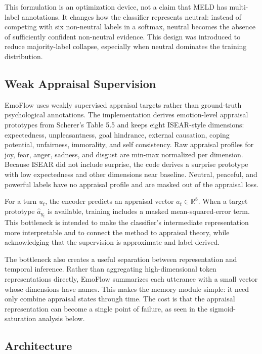 \documentclass[11pt]{article}
\begin{document}
This formulation is an optimization device, not a claim that MELD has multi-label annotations. It changes how the classifier represents neutral: instead of competing with six non-neutral labels in a softmax, neutral becomes the absence of sufficiently confident non-neutral evidence. This design was introduced to reduce majority-label collapse, especially when neutral dominates the training distribution.

\subsection{Weak Appraisal Supervision}

EmoFlow uses weakly supervised appraisal targets rather than ground-truth psychological annotations. The implementation derives emotion-level appraisal prototypes from Scherer's Table 5.5 and keeps eight ISEAR-style dimensions: expectedness, unpleasantness, goal hindrance, external causation, coping potential, unfairness, immorality, and self consistency. Raw appraisal profiles for joy, fear, anger, sadness, and disgust are min-max normalized per dimension. Because ISEAR did not include surprise, the code derives a surprise prototype with low expectedness and other dimensions near baseline. Neutral, peaceful, and powerful labels have no appraisal profile and are masked out of the appraisal loss.

For a turn $u_t$, the encoder predicts an appraisal vector $a_t \in \mathbb{R}^8$. When a target prototype $\hat{a}_{y_t}$ is available, training includes a masked mean-squared-error term. This bottleneck is intended to make the classifier's intermediate representation more interpretable and to connect the method to appraisal theory, while acknowledging that the supervision is approximate and label-derived.

The bottleneck also creates a useful separation between representation and temporal inference. Rather than aggregating high-dimensional token representations directly, EmoFlow summarizes each utterance with a small vector whose dimensions have names. This makes the memory module simple: it need only combine appraisal states through time. The cost is that the appraisal representation can become a single point of failure, as seen in the sigmoid-saturation analysis below.

\subsection{Architecture}
\end{document}

